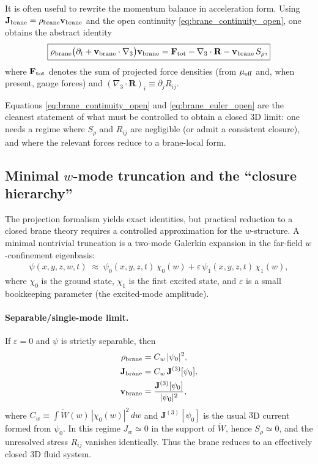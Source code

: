 \documentclass[11pt]{article}
\begin{document}
It is often useful to rewrite the momentum balance in acceleration form.  Using
$\mathbf{J}_{\rm brane}=\rho_{\rm brane}\mathbf{v}_{\rm brane}$ and the open
continuity \eqref{eq:brane_continuity_open}, one obtains the abstract identity
\begin{align}
\boxed{
\rho_{\rm brane}\big(\partial_t + \mathbf{v}_{\rm brane}\cdot\nabla_3\big)\mathbf{v}_{\rm brane}
=
\mathbf{F}_{\rm tot}
-\nabla_3\cdot \mathbf{R}
-\mathbf{v}_{\rm brane}\,S_\rho,
}
\label{eq:brane_euler_open}
\end{align}
where $\mathbf{F}_{\rm tot}$ denotes the sum of projected force densities (from
$\mu_{\rm eff}$ and, when present, gauge forces) and $(\nabla_3\cdot \mathbf{R})_i
\equiv \partial_j R_{ij}$.

Equations \eqref{eq:brane_continuity_open} and \eqref{eq:brane_euler_open} are
the cleanest statement of what must be controlled to obtain a closed 3D limit:
one needs a regime where $S_\rho$ and $R_{ij}$ are negligible (or admit a
consistent closure), and where the relevant forces reduce to a brane-local form.

\subsection{Minimal \texorpdfstring{$w$}{w}-mode truncation and the ``closure hierarchy''}
\label{sec:w_mode_truncation}

The projection formalism yields exact identities, but practical reduction to a
closed brane theory requires a controlled approximation for the $w$-structure.
A minimal nontrivial truncation is a two-mode Galerkin expansion in the
far-field $w$-confinement eigenbasis:
\begin{align}
\psi(x,y,z,w,t) \;\approx\;
\psi_0(x,y,z,t)\,\chi_0(w) + \varepsilon\,\psi_1(x,y,z,t)\,\chi_1(w),
\label{eq:two_mode_ansatz}
\end{align}
where $\chi_0$ is the ground state, $\chi_1$ is the first excited state, and
$\varepsilon$ is a small bookkeeping parameter (the excited-mode amplitude).

\paragraph{Separable/single-mode limit.}
If $\varepsilon=0$ and $\psi$ is strictly separable, then
\begin{align}
\rho_{\rm brane} &= C_w\,|\psi_0|^2,\\
\mathbf{J}_{\rm brane} &= C_w\,\mathbf{J}^{(3)}[\psi_0],\\
\mathbf{v}_{\rm brane} &= \frac{\mathbf{J}^{(3)}[\psi_0]}{|\psi_0|^2},
\end{align}
where $C_w\equiv\int \widetilde W(w)\,|\chi_0(w)|^2\,dw$ and
$\mathbf{J}^{(3)}[\psi_0]$ is the usual $3$D current formed from $\psi_0$.
In this regime $J_w\simeq 0$ in the support of $\widetilde W$, hence $S_\rho\simeq 0$,
and the unresolved stress $R_{ij}$ vanishes identically.  Thus the brane
reduces to an effectively closed $3$D fluid system.
\end{document}
